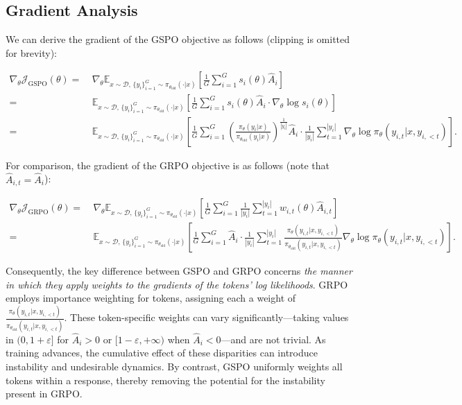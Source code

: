 \subsection{Gradient Analysis}
\label{subsec:gradient}

We can derive the gradient of the GSPO objective as follows (clipping is omitted for brevity):

\begin{align}
\nabla_{\theta} \mathcal{J}_\text{GSPO} (\theta)
=&\ 
\nabla_{\theta} \mathbb{E}_{ x \sim \mathcal{D},\, \{y_i\}_{i=1}^G \sim \pi_{\theta_\text{old}}( \cdot | x) }
\left[ 
\frac{1}{G} \sum_{i=1}^{G} s_{i}(\theta) \widehat{A}_{i}
\right] \\
= &\ 
\mathbb{E}_{ x \sim \mathcal{D},\, \{y_i\}_{i=1}^G \sim \pi_{\theta_\text{old}}( \cdot | x) }
\left[ 
\frac{1}{G} \sum_{i=1}^{G}
s_{i}(\theta) \widehat{A}_{i}
\cdot \nabla_{\theta} \log s_{i}(\theta)
\right] \\
=&\ 
\mathbb{E}_{ x \sim \mathcal{D},\, \{y_i\}_{i=1}^G \sim \pi_{\theta_\text{old}}( \cdot | x) }
\left[ 
\frac{1}{G} \sum_{i=1}^{G} 
\left( \frac{ \pi_{\theta} (y_i | x) }{ \pi_{\theta_\text{old}} (y_i | x)} \right)^{\frac{1}{|y_i|}} \widehat{A}_{i} 
\cdot \frac{1}{|y_i|} \sum_{t=1}^{|y_i|} \nabla_{\theta} \log \pi_{\theta} (y_{i,t} | x, y_{i,<t}) 
\right].
\label{equ:gspo_grad}
\end{align}

For comparison, the gradient of the GRPO objective is as follows (note that $\widehat{A}_{i,t} = \widehat{A}_{i}$):

\begin{align}
\nabla_{\theta} \mathcal{J}_\text{GRPO} (\theta) 
=&\ 
\nabla_{\theta} \mathbb{E}_{ x \sim \mathcal{D},\, \{y_i\}_{i=1}^G \sim \pi_{\theta_\text{old}}( \cdot | x) }
\left[ \frac{1}{G} \sum_{i=1}^{G} \frac{1}{|y_i|} \sum_{t=1}^{|y_i|} 
w_{i,t}(\theta) \widehat{A}_{i,t}
\right] \\
=&\
\mathbb{E}_{ x \sim \mathcal{D},\, \{y_i\}_{i=1}^G \sim \pi_{\theta_\text{old}}( \cdot | x) }
\left[ \frac{1}{G} \sum_{i=1}^{G} \widehat{A}_{i} 
\cdot \frac{1}{|y_i|} \sum_{t=1}^{|y_i|} 
\frac{ \pi_{\theta} (y_{i,t} | x, y_{i,<t}) }{ \pi_{\theta_\text{old}} (y_{i,t} | x,y_{i,<t})} 
\nabla_{\theta} \log \pi_{\theta} (y_{i,t} | x, y_{i,<t})  
\right].
\end{align}

Consequently, the key difference between GSPO and GRPO concerns \textit{the manner in which they apply weights to the gradients of the tokens’ log likelihoods}. GRPO employs importance weighting for tokens, assigning each a weight of $\frac{ \pi_{\theta} (y_{i,t} | x, y_{i,<t}) }{ \pi_{\theta_\text{old}} (y_{i,t} | x,y_{i,<t})}$. These token-specific weights can vary significantly—taking values in $(0, 1+\varepsilon]$ for $\widehat{A}_{i} >0$ or $[1-\varepsilon, +\infty)$ when $\widehat{A}_{i} < 0$—and are not trivial. As training advances, the cumulative effect of these disparities can introduce instability and undesirable dynamics. By contrast, GSPO uniformly weights all tokens within a response, thereby removing the potential for the instability present in GRPO.

